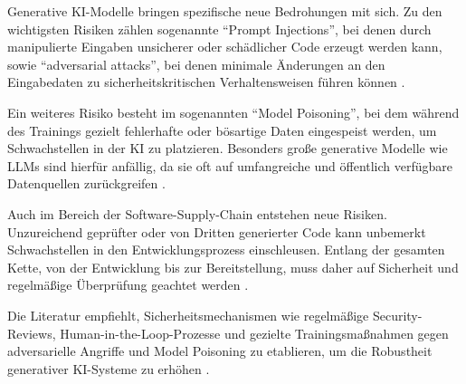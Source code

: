 
Generative KI-Modelle bringen spezifische neue Bedrohungen mit sich. Zu den
wichtigsten Risiken zählen sogenannte \enquote{Prompt Injections}, bei denen
durch manipulierte Eingaben unsicherer oder schädlicher Code erzeugt werden
kann, sowie \enquote{adversarial attacks}, bei denen minimale Änderungen an den
Eingabedaten zu sicherheitskritischen Verhaltensweisen führen können
\cite{shi_ai-assisted_2023}.

Ein weiteres Risiko besteht im sogenannten \enquote{Model Poisoning}, bei dem
während des Trainings gezielt fehlerhafte oder bösartige Daten eingespeist
werden, um Schwachstellen in der KI zu platzieren. Besonders große generative
Modelle wie LLMs sind hierfür anfällig, da sie oft auf umfangreiche und
öffentlich verfügbare Datenquellen zurückgreifen \cite{alwageed_role_nodate}.

Auch im Bereich der Software-Supply-Chain entstehen neue Risiken. Unzureichend
geprüfter oder von Dritten generierter Code kann unbemerkt Schwachstellen in
den Entwicklungsprozess einschleusen. Entlang der gesamten Kette, von der
Entwicklung bis zur Bereitstellung, muss daher auf Sicherheit und regelmäßige
Überprüfung geachtet werden \cite{siebert_generative_2024}.

Die Literatur empfiehlt, Sicherheitsmechanismen wie regelmäßige
Security-Reviews, Human-in-the-Loop-Prozesse und gezielte Trainingsmaßnahmen
gegen adversarielle Angriffe und Model Poisoning zu etablieren, um die
Robustheit generativer KI-Systeme zu erhöhen \cite{shi_ai-assisted_2023,
    alwageed_role_nodate, siebert_generative_2024}.
